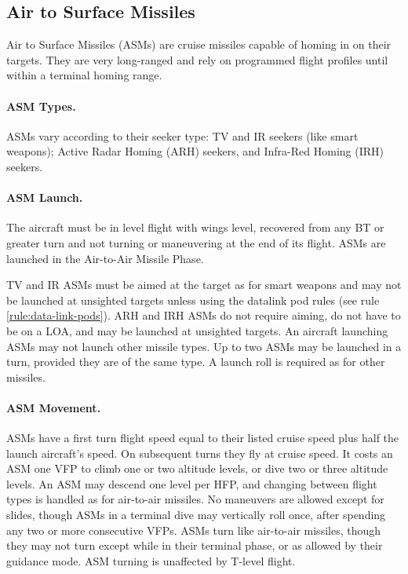\begin{advancedrules}
    

\section{Air to Surface Missiles}

Air to Surface Missiles (ASMs) are cruise missiles capable of homing in on their targets.  They are very long-ranged and rely on programmed flight profiles until within a terminal homing range.

\paragraph{ASM Types.} ASMs vary according to their seeker type: TV and IR seekers (like smart weapons); Active Radar Homing (ARH) seekers, and Infra-Red Homing (IRH) seekers.

\paragraph{ASM Launch.} The aircraft must be in level flight with wings level, recovered from any BT or greater turn and not turning or maneuvering at the end of its flight.  ASMs are launched in the Air-to-Air Missile Phase.

TV and IR ASMs must be aimed at the target as for smart weapons and may not be launched at unsighted targets unless using the datalink pod rules (see rule \ref{rule:data-link-pods}).  ARH and IRH ASMs do not require aiming, do not have to be on a LOA, and may be launched at unsighted targets.  An aircraft launching ASMs may not launch other missile types.  Up to two ASMs may be launched in a turn, provided they are of the same type.  A launch roll is required as for other missiles.


\paragraph{ASM Movement.} ASMs have a first turn flight speed equal to their listed cruise speed plus half the launch aircraft's speed.  On subsequent turns they fly at cruise speed.  It costs an ASM one VFP to climb one or two altitude levels, or dive two or three altitude levels.   An ASM may descend one level per HFP, and changing between flight types is handled as for air-to-air missiles.  No maneuvers are allowed except for slides, though ASMs in a terminal dive may vertically roll once, after spending any two or more consecutive VFPs.  ASMs turn like air-to-air missiles, though they may not turn except while in their terminal phase, or as allowed by their guidance mode.  ASM turning is unaffected by T-level flight.


\end{advancedrules}
